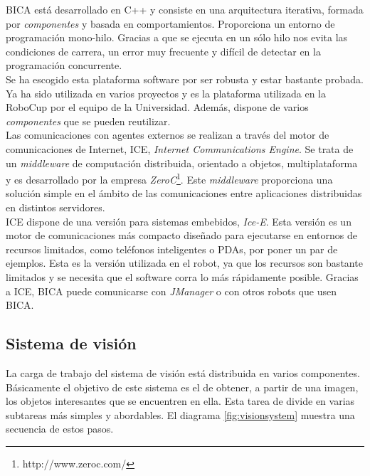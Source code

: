 BICA está desarrollado en C++ y consiste en una arquitectura iterativa, formada por \textit{componentes} y basada en comportamientos. Proporciona un entorno de programación mono-hilo. Gracias a que se ejecuta en un sólo hilo nos evita las condiciones de carrera, un error muy frecuente y difícil de detectar en la programación concurrente.\\

Se ha escogido esta plataforma software por ser robusta y estar bastante probada. Ya ha sido utilizada en varios proyectos y es la plataforma utilizada en la RoboCup por el equipo de la Universidad. Además, dispone de varios \textit{componentes} que se pueden reutilizar. \\

Las comunicaciones con agentes externos se realizan a través del motor de comunicaciones de Internet, ICE, \textit{Internet Communications Engine}. Se trata de un \textit{middleware} de computación distribuida, orientado a objetos, multiplataforma y es desarrollado por la empresa \textit{ZeroC}\footnote{http://www.zeroc.com/}. Este \textit{middleware} proporciona una solución simple en el ámbito de las comunicaciones entre aplicaciones distribuidas en distintos servidores.\\

ICE dispone de una versión para sistemas embebidos, \textit{Ice-E}. Esta versión es un motor de comunicaciones más compacto diseñado para ejecutarse en entornos de recursos limitados, como teléfonos inteligentes o PDAs, por poner un par de ejemplos. Esta es la versión utilizada en el robot, ya que los recursos son bastante limitados y se necesita que el software corra lo más rápidamente posible. Gracias a ICE, BICA puede comunicarse con \textit{JManager} o con otros robots que usen BICA.

\subsection{Sistema de visión}
\label{subsec:sistemadevision}

La carga de trabajo del sistema de visión está distribuida en varios componentes. Básicamente el objetivo de este sistema es el de obtener, a partir de una imagen, los objetos interesantes que se encuentren en ella. Esta tarea de divide en varias subtareas más simples y abordables. El diagrama \ref{fig:visionsystem} muestra una secuencia de estos pasos.

